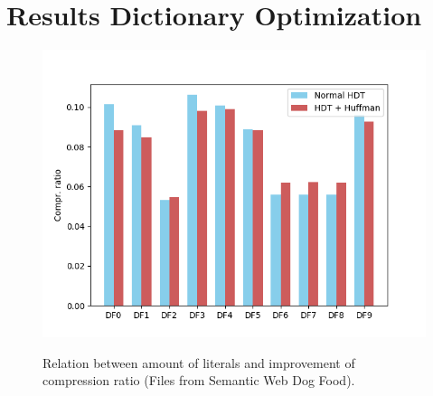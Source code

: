 \documentclass[a4paper]{scrartcl}
\begin{document}
\section{Results Dictionary Optimization}

\begin{figure}
	\centering
	\includegraphics[width=1\linewidth]{../thesis/figures/4_evaluation/dogFoodComprRatios}
	\caption{}
	\label{fig:dogfoodcomprratios}
\end{figure}



\begin{figure}[h]
	\centering
	\hfill
	\caption{Relation between amount of literals and improvement of compression ratio (Files from Semantic Web Dog Food).}
\end{figure}
\end{document}
